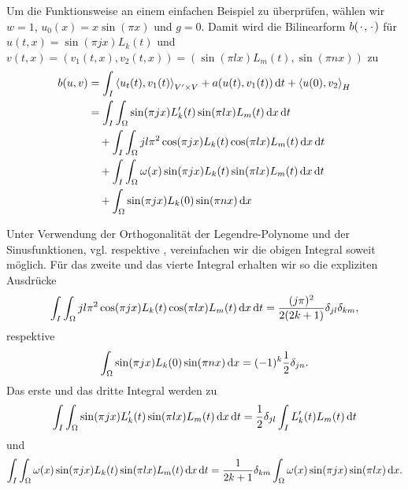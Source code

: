 Um die Funktionsweise an einem einfachen Beispiel zu überprüfen, wählen wir $w = 1$, $u_{0}(x) = x \sin(\pi x)$ und $g = 0$.
Damit wird die Bilinearform $b({\mkern2mu\cdot\mkern2mu}, {\mkern2mu\cdot\mkern2mu})$ für $u(t, x) = \sin(\pi j x) L_{k}(t)$ und $v(t,x) = (v_{1}(t,x), v_{2}(t,x)) = (\sin(\pi l x) L_{m}(t), \sin(\pi n x))$ zu
\begin{subequations}
    \begin{align}
    b(u, v)
        &= \int_{I} \skprod{u_{t}(t)}{v_{1}(t)}_{V' \times V} + a(u(t), v_{1}(t)) \diff t + \skprod{u(0)}{v_{2}}_{H}
        \\&= \int_{I} \int_{\Omega} \sin(\pi j x) L_{k}'(t) \sin(\pi l x) L_{m}(t) \diff x \diff t \label{eq:int1}
        \\&\quad  + \int_{I} \int_{\Omega} j l \pi^2 \cos(\pi j x) L_{k}(t) \cos(\pi l x) L_{m}(t) \diff x \diff t  \label{eq:int2}
        \\&\quad + \int_{I} \int_{\Omega} \omega(x) \sin(\pi j x) L_{k}(t) \sin(\pi l x) L_{m}(t) \diff x \diff t  \label{eq:int3}
        \\&\quad + \int_{\Omega} \sin(\pi j x) L_{k}(0) \sin(\pi n x) \diff x  \label{eq:int4}
    \end{align}
\end{subequations}

Unter Verwendung der Orthogonalität der Legendre-Polynome und der Sinusfunktionen, vgl.  respektive , vereinfachen wir die obigen Integral soweit möglich.
Für das zweite und das vierte Integral erhalten wir so die expliziten Ausdrücke
\begin{equation}
    \int_{I} \int_{\Omega} j l \pi^2 \cos(\pi j x) L_{k}(t) \cos(\pi l x) L_{m}(t) \mathop{}\!\mathrm{d} x \mathop{}\!\mathrm{d} t
    = \frac{(j \pi)^{2}}{2(2k + 1)} \delta_{j l}  \delta_{k m},
\end{equation}
respektive
\begin{equation}
    \int_{\Omega} \sin(\pi j x) L_{k}(0) \sin(\pi n x) \mathop{}\!\mathrm{d} x = (-1)^{k} \frac{1}{2} \delta_{jn}.
\end{equation}
Das erste und das dritte Integral werden zu
\begin{equation}
    \int_{I} \int_{\Omega} \sin(\pi j x) L_{k}'(t) \sin(\pi l x) L_{m}(t) \mathop{}\!\mathrm{d} x \mathop{}\!\mathrm{d} t
    = \frac{1}{2} \delta_{j l} \int_{I} L_{k}'(t) L_{m}(t) \mathop{}\!\mathrm{d} t
\end{equation}
und
\begin{equation}
    \int_{I} \int_{\Omega} \omega(x) \sin(\pi j x) L_{k}(t) \sin(\pi l x) L_{m}(t) \mathop{}\!\mathrm{d} x \mathop{}\!\mathrm{d} t
    = \frac{1}{2k +1} \delta_{k m} \int_{\Omega} \omega(x) \sin(\pi j x)\sin(\pi l x) \mathop{}\!\mathrm{d} x.
\end{equation}

